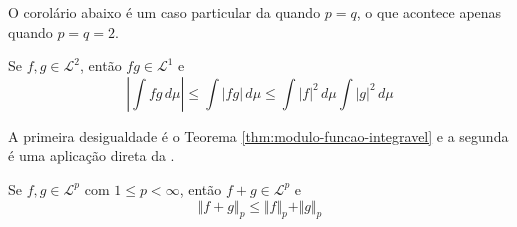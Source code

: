 \documentclass[a4paper, 11pt]{book}
\theoremstyle{definition}
\newcommand{\cL}{\mathcal{L}}
\begin{document}
O corolário abaixo é um caso particular da  quando $p = q$, o que acontece apenas quando $p = q = 2$.

\begin{cbox}
    Se $f, g \in \cL^2$, então $fg \in \cL^1$ e
    \[
        \left\vert \int fg \, d\mu \right\vert \leqslant  \int |fg| \, d\mu \leqslant \int |f|^2 \, d\mu \int |g|^2 \, d\mu
    \]
\end{cbox}
\begin{prf}
    A primeira desigualdade é o Teorema \ref{thm:modulo-funcao-integravel} e a segunda é uma aplicação direta da .
\end{prf}

\begin{tbox}
    Se $f, g \in \cL^p$ com $1 \leqslant p < \infty$, então $f + g \in \cL^p$ e
    \[
        \Vert f + g \Vert_p \leqslant \Vert f \Vert_p + \Vert g \Vert_p
    \]
\end{tbox}
\end{document}
